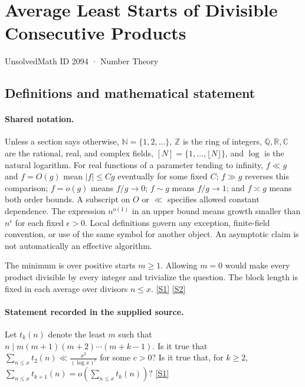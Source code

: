 \documentclass[11pt,a4paper]{article}
\newcommand{\N}{\mathbb{N}}
\newcommand{\Z}{\mathbb{Z}}
\newcommand{\Q}{\mathbb{Q}}
\newcommand{\R}{\mathbb{R}}
\newcommand{\C}{\mathbb{C}}
\newcommand{\sref}[2]{\hyperlink{source:#1:#2}{[S#2]}}
\begin{document}

\setcounter{section}{2093}

\section{Average Least Starts of Divisible Consecutive Products}\label{2094}

{\small\sffamily UnsolvedMath ID 2094 · Number Theory}

\subsection{Definitions and mathematical statement}

\paragraph{Shared notation.}Unless a section says otherwise, $\N=\{1,2,\ldots\}$,
$\Z$ is the ring of integers, $\Q,\R,\C$ are the rational, real, and complex
fields, $[N]=\{1,\ldots,\lfloor N\rfloor\}$, and $\log$ is the natural
logarithm. For real functions of a parameter tending to infinity,
$f\ll g$ and $f=O(g)$ mean $|f|\leq Cg$ eventually for some fixed $C$;
$f\gg g$ reverses this comparison; $f=o(g)$ means $f/g\to0$;
$f\sim g$ means $f/g\to1$; and $f\asymp g$ means both order bounds.
A subscript on $O$ or $\ll$ specifies allowed constant dependence.
The expression $n^{o(1)}$ in an upper bound means growth smaller than
$n^\epsilon$ for each fixed $\epsilon>0$. Local definitions govern any
exception, finite-field convention, or use of the same symbol for another
object. An asymptotic claim is not automatically an effective algorithm.



The minimum is over positive starts $m\geq1$. Allowing $m=0$ would make every product divisible by every integer and trivialize the question. The block length is fixed in each average over divisors $n\leq x$. \sref{2094}{1} \sref{2094}{2}

\paragraph{Statement recorded in the supplied source.}
Let $t_k(n)$ denote the least $m$ such that $ n\mid m(m+1)(m+2)\cdots (m+k-1). $ Is it true that $ \sum_{n\leq x}t_2(n)\ll \frac{x^2}{(\log x)^c} $ for some $c>0$?
Is it true that, for $k\geq 2$, $ \sum_{n\leq x}t_{k+1}(n) =o\left(\sum_{n\leq x}t_k(n)\right)? $ \sref{2094}{1}
\end{document}
